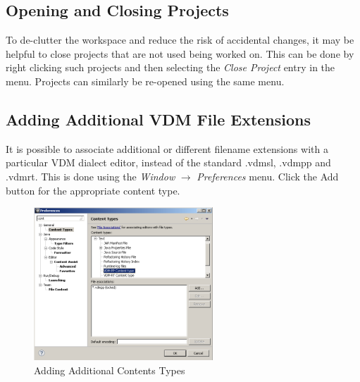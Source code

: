 \documentclass{overturerepchap}
\begin{document}
\subsection{Opening and Closing Projects}

To de-clutter the workspace and reduce the risk of accidental changes,
it may be helpful to close projects that are not used being worked on.
This can be done by right clicking such projects and then selecting the
\emph{Close Project} entry in the menu. Projects can similarly be re-opened
using the same menu. 
 

\subsection{Adding Additional VDM File Extensions}

It is possible to associate additional or different filename extensions with a
particular VDM dialect editor, instead of the standard {\ttfamily .vdmsl},
{\ttfamily .vdmpp} and {\ttfamily .vdmrt}. This is done using the \emph{Window}
$\rightarrow$ \emph{Preferences} menu. Click the Add
button for the appropriate content type.

\begin{figure}[!htb]
\begin{center}
\includegraphics[width=0.6\textwidth]{screenDumps/contentstypes}
\caption{Adding Additional Contents Types\label{fig:ContentsTypes}}
\end{center}
\end{figure}
\end{document}

